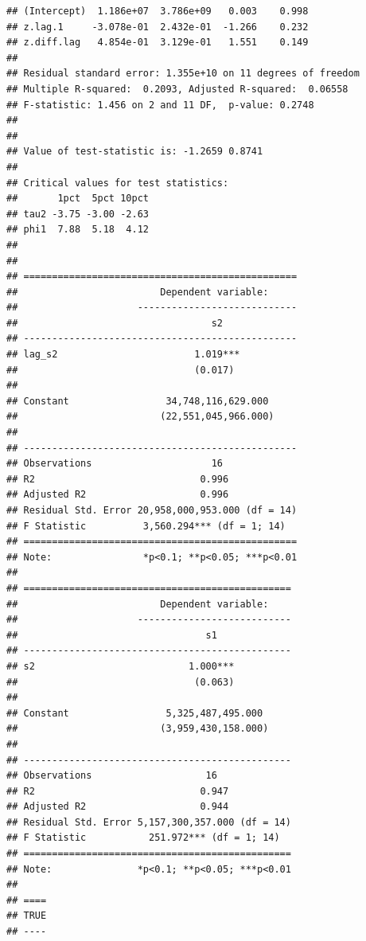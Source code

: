 \documentclass[
]{article}
\begin{document}
\begin{verbatim}
## (Intercept)  1.186e+07  3.786e+09   0.003    0.998
## z.lag.1     -3.078e-01  2.432e-01  -1.266    0.232
## z.diff.lag   4.854e-01  3.129e-01   1.551    0.149
## 
## Residual standard error: 1.355e+10 on 11 degrees of freedom
## Multiple R-squared:  0.2093, Adjusted R-squared:  0.06558 
## F-statistic: 1.456 on 2 and 11 DF,  p-value: 0.2748
## 
## 
## Value of test-statistic is: -1.2659 0.8741 
## 
## Critical values for test statistics: 
##       1pct  5pct 10pct
## tau2 -3.75 -3.00 -2.63
## phi1  7.88  5.18  4.12
## 
## 
## ================================================
##                         Dependent variable:     
##                     ----------------------------
##                                  s2             
## ------------------------------------------------
## lag_s2                        1.019***          
##                               (0.017)           
##                                                 
## Constant                 34,748,116,629.000     
##                         (22,551,045,966.000)    
##                                                 
## ------------------------------------------------
## Observations                     16             
## R2                             0.996            
## Adjusted R2                    0.996            
## Residual Std. Error 20,958,000,953.000 (df = 14)
## F Statistic          3,560.294*** (df = 1; 14)  
## ================================================
## Note:                *p<0.1; **p<0.05; ***p<0.01
## 
## ===============================================
##                         Dependent variable:    
##                     ---------------------------
##                                 s1             
## -----------------------------------------------
## s2                           1.000***          
##                               (0.063)          
##                                                
## Constant                 5,325,487,495.000     
##                         (3,959,430,158.000)    
##                                                
## -----------------------------------------------
## Observations                    16             
## R2                             0.947           
## Adjusted R2                    0.944           
## Residual Std. Error 5,157,300,357.000 (df = 14)
## F Statistic           251.972*** (df = 1; 14)  
## ===============================================
## Note:               *p<0.1; **p<0.05; ***p<0.01
## 
## ====
## TRUE
## ----
\end{verbatim}
\end{document}
